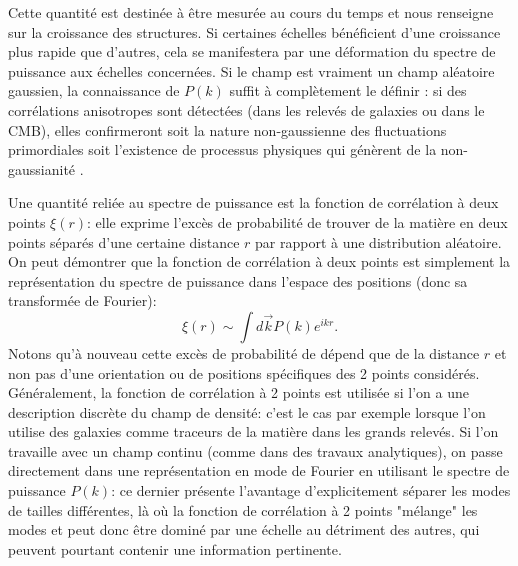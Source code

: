 Cette quantité est destinée à être mesurée au cours du temps et nous renseigne sur la croissance des structures. Si certaines échelles bénéficient d'une croissance plus rapide que d'autres, cela se manifestera par une déformation du spectre de puissance aux échelles concernées.  Si le champ est vraiment un champ aléatoire gaussien, la connaissance de $P(k)$ suffit à complètement le définir : si des corrélations anisotropes sont détectées (dans les relevés de galaxies ou dans le CMB), elles confirmeront soit la nature non-gaussienne des fluctuations primordiales soit l'existence de processus physiques qui génèrent de la non-gaussianité .

Une quantité reliée au spectre de puissance est la fonction de corrélation à deux points $\xi (r)$: elle exprime l'excès de probabilité de trouver de la matière en deux points séparés d'une certaine distance $r$ par rapport à une distribution aléatoire. On peut démontrer que la fonction de corrélation à deux points est simplement la représentation du spectre de puissance dans l'espace des positions (donc sa transformée de Fourier):
\begin{equation}
\xi (r)\sim \int d\vec k P(k) e^{i k r}.
\end{equation}
Notons qu'à nouveau cette excès de probabilité de dépend que de la distance $r$ et non pas d'une orientation ou de positions spécifiques des 2 points considérés. Généralement, la fonction de corrélation à 2 points est utilisée si l'on a une description discrète du champ de densité: c'est le cas par exemple lorsque l'on utilise des galaxies comme traceurs de la matière dans les grands relevés. Si l'on travaille avec un champ continu (comme dans des travaux analytiques), on passe directement dans une représentation en mode de Fourier en utilisant le spectre de puissance $P(k)$: ce dernier présente l'avantage d'explicitement séparer les modes de tailles différentes, là où la fonction de corrélation à 2 points "mélange" les modes et peut donc être dominé par une échelle au détriment des autres, qui peuvent pourtant contenir une information pertinente.

